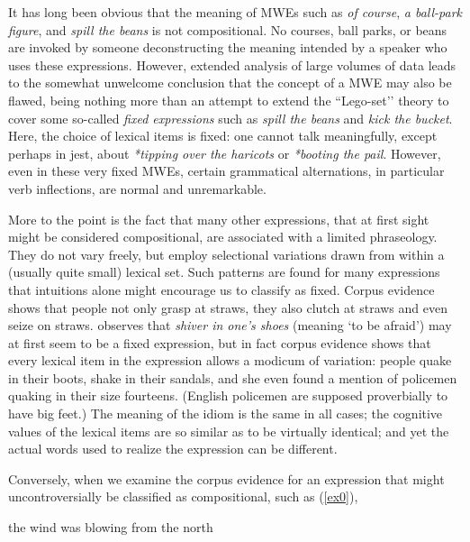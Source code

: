 \documentclass[output=paper]{langsci/langscibook}
\begin{document}
It has long been obvious that the meaning of MWEs such as \textit{of course},
\textit{a ball-park figure}, and \textit{spill the beans} is not compositional. No
courses, ball parks, or beans are invoked by someone deconstructing the
meaning intended by a speaker who uses these expressions. However,
extended analysis of large volumes of data leads to the somewhat
unwelcome conclusion that the concept of a MWE may also be flawed,
being nothing more than an attempt to extend the ``Lego-set’' theory to
  cover some so-called \textit{fixed expressions} such as \textit{spill the beans} and
\textit{kick the bucket}. Here, the choice of lexical items is fixed: one
cannot talk meaningfully, except perhaps in jest, about \textit{*tipping over
the haricots} or \textit{*booting the pail}. However, even in these very fixed
MWEs, certain grammatical alternations, in particular verb inflections,
are normal and unremarkable.



More to the point is the fact that many other expressions, that at first
sight might be considered compositional, are associated with a limited
phraseology. They do not vary freely, but employ selectional variations
drawn from within a (usually quite small) lexical set. Such patterns
are found for many expressions that intuitions alone might encourage us
to classify as fixed. Corpus evidence shows that people not only grasp
at straws, they also clutch at straws and even seize on straws. \cite{moon1998} observes that \textit{shiver in one’s shoes} (meaning `to be afraid') may
at first seem to be a fixed expression, but in fact corpus evidence
shows that every lexical item in the expression allows a modicum of
variation: people quake in their boots, shake in their sandals, and she
even found a mention of policemen quaking in their size fourteens.
(English policemen are supposed proverbially to have big feet.) The
meaning of the idiom is the same in all cases; the cognitive values of
the lexical items are so similar as to be virtually identical; and yet
the actual words used to realize the expression can be different. 


Conversely, when we examine the corpus evidence for an expression that
might uncontroversially be classified as compositional, such as (\ref{ex0}), 


\ea
\label{ex0}
the wind was blowing from the north
\z
\end{document}
